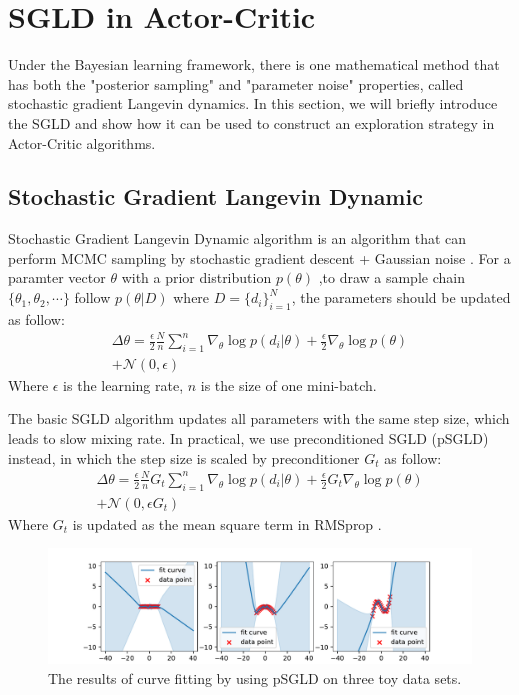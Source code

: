 \section{SGLD in Actor-Critic}
Under the Bayesian learning framework, there is one mathematical method that has both the "posterior sampling" and "parameter noise" properties, called stochastic gradient Langevin dynamics. In this section, we will briefly introduce the SGLD and show how it can be used to construct an exploration strategy in Actor-Critic algorithms.

\subsection{Stochastic Gradient Langevin Dynamic}
Stochastic Gradient Langevin Dynamic algorithm is an algorithm that can perform MCMC sampling by stochastic gradient descent + Gaussian noise \cite{SGLD}. For a paramter vector $\theta$ with a prior distribution $p(\theta)$ ,to draw a sample chain $\{\theta_1,\theta_2,\cdots\}$ follow $p(\theta|D)$ where $D=\{d_i\}^N_{i=1}$, the parameters should be updated as follow:
\begin{equation}
   \label{eq:sgld} 
   \begin{aligned}
\Delta\theta =\frac{\epsilon}{2}\frac{N}{n}\sum_{i=1}^{n}\nabla_\theta\log p(d_i|\theta)+\frac{\epsilon}{2}\nabla_\theta\log p(\theta)\\
+\mathcal{N}(0,\epsilon)
\end{aligned}
\end{equation}
Where $\epsilon$ is the learning rate, $n$ is the size of one mini-batch. 

The basic SGLD algorithm updates all parameters with the same step size, which leads to slow mixing rate. In practical, we use preconditioned SGLD (pSGLD) instead, in which the step size is scaled by preconditioner $G_t$ as follow:
\begin{equation}
   \label{eq:psgld} 
   \begin{aligned}
      \Delta\theta =\frac{\epsilon}{2}\frac{N}{n}G_t\sum_{i=1}^{n}\nabla_\theta\log p(d_i|\theta)+\frac{\epsilon}{2}G_t\nabla_\theta\log p(\theta)\\
      +\mathcal{N}(0,\epsilon G_t)
   \end{aligned}
\end{equation}
Where $G_t$ is updated as the mean square term in RMSprop \cite{rmsprop}.
\begin{figure}[htbp]
   \begin{center}
      \centerline{\includegraphics[width=480pt]{figs/three-curve}}
   \caption{The results of curve fitting by using pSGLD on three toy data sets.}
   \label{fig:three}
   \end{center}
\end{figure}

